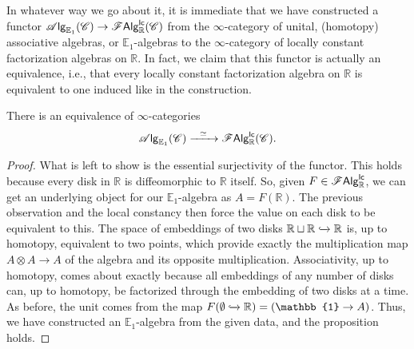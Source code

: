 \documentclass[../text.tex]{subfiles}
\begin{document}
\begin{construction}
    In whatever way we go about it, it is immediate that we have constructed a functor $\mathscr{A} \mathsf{lg}_{\mathbb{E}_1}(\mathscr{C}) \rightarrow \mathscr{F} \mathsf{Alg}^{\mathsf{lc}}_{\mathbb{R}} (\mathscr{C})$ from the $\infty$-category of unital, (homotopy) associative algebras, or $\mathbb{E}_1$-algebras to the $\infty$-category of locally constant factorization algebras on $\mathbb{R}$. In fact, we claim that this functor is actually an equivalence, i.e., that every locally constant factorization algebra on $\mathbb{R}$ is equivalent to one induced like in the construction.
\end{construction}

\begin{proposition}\label{prop:R_gives_E1}
    There is an equivalence of $\infty$-categories
    \begin{equation}
        \alg{\mathbb{E}_1}(\catC) \xrightarrow{\ \ \simeq \ \ } \lcfa_{\mathbb{R}} (\catC).
    \end{equation}
\end{proposition}

\begin{proof}
    What is left to show is the essential surjectivity of the functor. This holds because every disk in $\mathbb{R}$ is diffeomorphic to $\mathbb{R}$ itself. So, given $F \in \mathscr{F} \mathsf{Alg}^{\mathsf{lc}}_{\mathbb{R}}$, we can get an underlying object for our $\mathbb{E}_1$-algebra as $A = F(\mathbb{R})$. The previous observation and the local constancy then force the value on each disk to be equivalent to this. The space of embeddings of two disks $\mathbb{R} \sqcup \mathbb{R} \xhookrightarrow{} \mathbb{R}$ is, up to homotopy, equivalent to two points, which provide exactly the multiplication map $ A \otimes A \rightarrow A$ of the algebra and its opposite multiplication.  Associativity, up to homotopy, comes about exactly because all embeddings of any number of disks can, up to homotopy, be factorized through the embedding of two disks at a time. As before, the unit comes from the map $F(\emptyset \xhookrightarrow{} \mathbb{R}) = (\mathbb{1} \rightarrow A)$. Thus, we have constructed an $\mathbb{E}_1$-algebra from the given data, and the proposition holds.
\end{proof}
\end{document}
